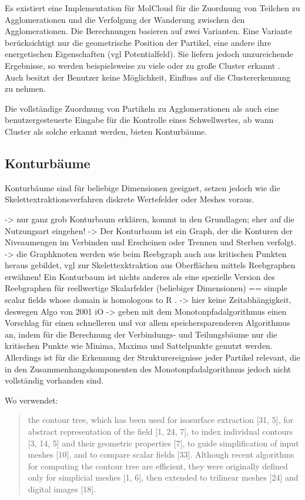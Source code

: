 
Es existiert eine Implementation für MolCloud für die Zuordnung von Teilchen zu Agglomerationen und die Verfolgung der Wanderung zwischen den Agglomerationen. Die Berechnungen basieren auf zwei Varianten. Eine Variante berücksichtigt nur die geometrische Position der Partikel, eine andere ihre energetischen Eigenschaften (vgl Potentialfeld). Sie liefern jedoch unzureichende Ergebnisse, so werden beispielsweise zu viele oder zu große Cluster erkannt \cite{vis07grottel}. Auch besitzt der Benutzer keine Möglichkeit, Einfluss auf die Clustererkennung zu nehmen.

Die vollständige Zuordnung von Partikeln zu Agglomerationen als auch eine benutzergesteuerte Eingabe für die Kontrolle eines Schwellwertes, ab wann Cluster als solche erkannt werden, bieten Konturbäume.

\subsection*{Konturbäume}

Konturbäume sind für beliebige Dimensionen geeignet, setzen jedoch wie die Skelettextraktionsverfahren diskrete Wertefelder oder Meshes voraus.

-> nur ganz grob Konturbaum erklären, kommt in den Grundlagen; eher auf die Nutzungsart eingehen! -> Der Konturbaum ist ein Graph, der die Konturen der Niveaumengen im Verbinden und Erscheinen oder Trennen und Sterben verfolgt.
-> die Graphknoten werden wie beim Reebgraph auch aus kritischen Punkten heraus gebildet, vgl zur Skelettexktraktion aus Oberflächen mittels Reebgraphen erwähnen! Ein Konturbaum ist nichts anderes als eine spezielle Version des Reebgraphen für reellwertige Skalarfelder (beliebiger Dimensionen) == simple scalar fields whose domain is homologous to R \cite[S.~44]{carr2010flexibleIsosurfaces}.
-> hier keine Zeitabhängigkeit, deswegen Algo von 2001 iO
-> \cite{chiang2005contourTreesUsingMonotonePaths} geben mit dem Monotonpfadalgorithmus einen Vorschlag für einen schnelleren und vor allem speichersparenderen Algorithmus an, indem für die Berechnung der Verbindungs- und Teilungsbäume nur die kritischen Punkte wie Minima, Maxima und Sattelpunkte genutzt werden. Allerdings ist für die Erkennung der Strukturereignisse jeder Partikel relevant, die in den Zusammenhangskomponenten des Monotonpfadalgorithmus jedoch nicht vollständig vorhanden sind.

Wo verwendet:
\blockcquote[1]{carr2009representingInterpolantTopology}{the contour tree, which has been used for isosurface extraction [31, 5], for abstract representation of the field [1, 24, 7], to index individual contours [3, 14, 5] and their geometric properties [7], to guide simplification of input meshes [10], and to compare scalar fields [33].
Although recent algorithms for computing the contour tree are efficient, they were originally defined only for simplicial meshes [1, 6], then extended to trilinear meshes [24] and digital images [18].}

